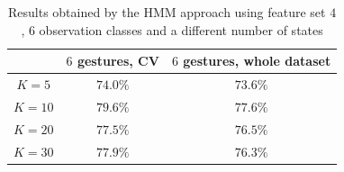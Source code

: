 \begin{table}[htbp!]
\begin{center}
	\label{tab:dyn3}
	\caption{Results obtained by the HMM approach using feature set $4$, $6$ observation classes and a different number of states}
    \begin{tabular}{ccc}
    \hline
    ~                                 & $6$ gestures, CV & $6$ gestures, whole dataset  \\ \hline
	$K = 5$                  	  & $74.0\%$ & $73.6\%$   \\ \hline
    $K = 10$                     & $79.6\%$ & $77.6\%$   \\ \hline
    $K = 20$                    & $77.5\%$ & $76.5\%$   \\ \hline
    $K = 30$                     & $77.9\%$ & $76.3\%$   \\ \hline
    \end{tabular}
\end{center}
\end{table}
